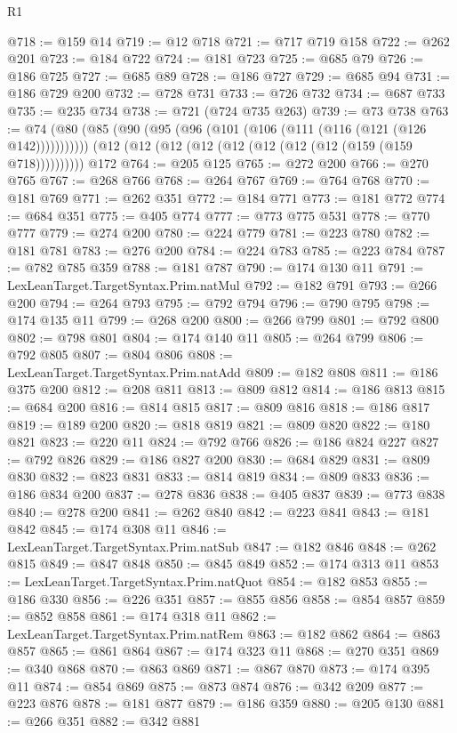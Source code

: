 \begin{lexlean}{R1}
\begin{coremodule}
@718 := @159 @14
@719 := @12 @718
@721 := @717 @719 @158
@722 := @262 @201
@723 := @184 @722
@724 := @181 @723
@725 := @685 @79
@726 := @186 @725
@727 := @685 @89
@728 := @186 @727
@729 := @685 @94
@731 := @186 @729 @200
@732 := @728 @731
@733 := @726 @732
@734 := @687 @733
@735 := @235 @734
@738 := @721 (@724 @735 @263)
@739 := @73 @738
@763 := @74
    (@80 (@85 (@90 (@95 (@96 (@101 (@106 (@111 (@116 (@121 (@126 @142)))))))))))
    (@12 (@12 (@12 (@12 (@12 (@12 (@12 (@12 (@159 (@159 @718))))))))))
    @172
@764 := @205 @125
@765 := @272 @200
@766 := @270 @765
@767 := @268 @766
@768 := @264 @767
@769 := @764 @768
@770 := @181 @769
@771 := @262 @351
@772 := @184 @771
@773 := @181 @772
@774 := @684 @351
@775 := @405 @774
@777 := @773 @775 @531
@778 := @770 @777
@779 := @274 @200
@780 := @224 @779
@781 := @223 @780
@782 := @181 @781
@783 := @276 @200
@784 := @224 @783
@785 := @223 @784
@787 := @782 @785 @359
@788 := @181 @787
@790 := @174 @130 @11
@791 := LexLeanTarget.TargetSyntax.Prim.natMul
@792 := @182 @791
@793 := @266 @200
@794 := @264 @793
@795 := @792 @794
@796 := @790 @795
@798 := @174 @135 @11
@799 := @268 @200
@800 := @266 @799
@801 := @792 @800
@802 := @798 @801
@804 := @174 @140 @11
@805 := @264 @799
@806 := @792 @805
@807 := @804 @806
@808 := LexLeanTarget.TargetSyntax.Prim.natAdd
@809 := @182 @808
@811 := @186 @375 @200
@812 := @208 @811
@813 := @809 @812
@814 := @186 @813
@815 := @684 @200
@816 := @814 @815
@817 := @809 @816
@818 := @186 @817
@819 := @189 @200
@820 := @818 @819
@821 := @809 @820
@822 := @180 @821
@823 := @220 @11
@824 := @792 @766
@826 := @186 @824 @227
@827 := @792 @826
@829 := @186 @827 @200
@830 := @684 @829
@831 := @809 @830
@832 := @823 @831
@833 := @814 @819
@834 := @809 @833
@836 := @186 @834 @200
@837 := @278 @836
@838 := @405 @837
@839 := @773 @838
@840 := @278 @200
@841 := @262 @840
@842 := @223 @841
@843 := @181 @842
@845 := @174 @308 @11
@846 := LexLeanTarget.TargetSyntax.Prim.natSub
@847 := @182 @846
@848 := @262 @815
@849 := @847 @848
@850 := @845 @849
@852 := @174 @313 @11
@853 := LexLeanTarget.TargetSyntax.Prim.natQuot
@854 := @182 @853
@855 := @186 @330
@856 := @226 @351
@857 := @855 @856
@858 := @854 @857
@859 := @852 @858
@861 := @174 @318 @11
@862 := LexLeanTarget.TargetSyntax.Prim.natRem
@863 := @182 @862
@864 := @863 @857
@865 := @861 @864
@867 := @174 @323 @11
@868 := @270 @351
@869 := @340 @868
@870 := @863 @869
@871 := @867 @870
@873 := @174 @395 @11
@874 := @854 @869
@875 := @873 @874
@876 := @342 @209
@877 := @223 @876
@878 := @181 @877
@879 := @186 @359
@880 := @205 @130
@881 := @266 @351
@882 := @342 @881

\end{coremodule}
\end{lexlean}
